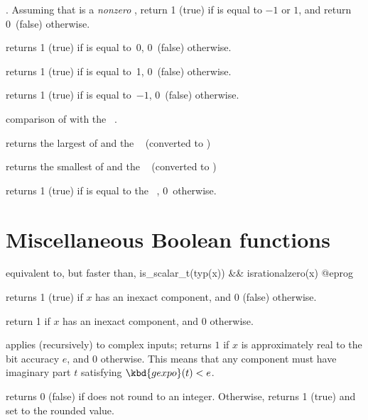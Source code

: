 . Assuming that  is a
\emph{nonzero} , return 1 (true) if  is equal to $-1$ or
$1$, and return 0~(false) otherwise.

 returns 1 (true) if  is equal to~0, 0~(false)
otherwise.

 returns 1 (true) if  is equal to~1, 0~(false)
otherwise.

 returns 1 (true) if  is equal to~$-1$,
0~(false) otherwise.



 comparison of  with the
~.


 returns the largest of  and
the ~ (converted to )


 returns the smallest of  and the
~ (converted to )


 returns 1 (true) if  is equal to
the ~, 0~otherwise.

\section{Miscellaneous Boolean functions}

 equivalent to, but faster than,
\bprog
  is_scalar_t(typ(x)) && isrationalzero(x)
@eprog

 returns 1 (true) if $x$ has an inexact
component, and 0 (false) otherwise.

 return 1 if $x$ has an inexact
 component, and 0  otherwise.

 applies (recursively) to complex inputs;
returns $1$ if $x$ is approximately real to the bit accuracy $e$, and 0
otherwise. This means that any  component must have imaginary part
$t$ satisfying $\kbd{gexpo}(t) < e$.

 returns 0 (false) if  does not round
to an integer. Otherwise, returns 1 (true) and set  to the rounded
value.

